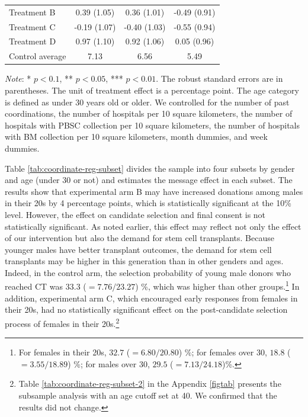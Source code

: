 \documentclass [12pt, a4paper]{article}
\begin{document}
\begin{table}
\begin{threeparttable}
\begin{tabular}[t]{lccc}
\hspace{1em}Treatment B & 0.39 (1.05) & 0.36 (1.01) & -0.49 (0.91)\\
\hspace{1em}Treatment C & -0.19 (1.07) & -0.40 (1.03) & -0.55 (0.94)\\
\hspace{1em}Treatment D & 0.97 (1.10) & 0.92 (1.06) & 0.05 (0.96)\\
\hspace{1em}Control average & 7.13 & 6.56 & 5.49\\
\bottomrule
\end{tabular}
\begin{tablenotes}
\item \emph{Note}: * $p < 0.1$, ** $p < 0.05$, *** $p < 0.01$. The robust standard errors are in parentheses. The unit of treatment effect is a percentage point. The age category is defined as under 30 years old or older. We controlled for the number of past coordinations, the number of hospitals per 10 square kilometers, the number of hospitals with PBSC collection per 10 square kilometers, the number of hospitals with BM collection per 10 square kilometers, month dummies, and week dummies.
\end{tablenotes}
\end{threeparttable}
\end{table}

Table \ref{tab:coordinate-reg-subset} divides the sample into four subsets by gender and age (under 30 or not) and estimates the message effect in each subset. The results show that experimental arm B may have increased donations among males in their 20s by 4 percentage points, which is statistically significant at the 10\% level. However, the effect on candidate selection and final consent is not statistically significant. As noted earlier, this effect may reflect not only the effect of our intervention but also the demand for stem cell transplants. Because younger males have better transplant outcomes, the demand for stem cell transplants may be higher in this generation than in other genders and ages. Indeed, in the control arm, the selection probability of young male donors who reached CT was \(33.3\) (\(=7.76/23.27\)) \%, which was higher than other groups.\footnote{For females in their 20s, \(32.7\) (\(=6.80 / 20.80\)) \%; for females over 30, \(18.8\) (\(=3.55 / 18.89\)) \%; for males over 30, \(29.5\) (\(=7.13/24.18\))\%.} In addition, experimental arm C, which encouraged early responses from females in their 20s, had no statistically significant effect on the post-candidate selection process of females in their 20s.\footnote{Table \ref{tab:coordinate-reg-subset-2} in the Appendix \ref{figtab} presents the subsample analysis with an age cutoff set at 40. We confirmed that the results did not change.}
\end{document}
